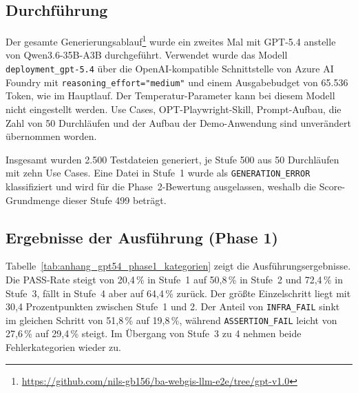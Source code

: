 \subsection{Durchführung}

Der gesamte Generierungsablauf\footnote{\url{https://github.com/nils-gb156/ba-webgis-llm-e2e/tree/gpt-v1.0}} wurde ein zweites Mal mit GPT-5.4 anstelle von Qwen3.6-35B-A3B durchgeführt. Verwendet wurde das Modell \texttt{deployment\_gpt-5.4} über die OpenAI-kompatible Schnittstelle von Azure AI Foundry mit \texttt{reasoning\_effort="medium"} und einem Ausgabebudget von 65.536 Token, wie im Hauptlauf. Der Temperatur-Parameter kann bei diesem Modell nicht eingestellt werden. Use Cases, OPT-Playwright-Skill, Prompt-Aufbau, die Zahl von 50 Durchläufen und der Aufbau der Demo-Anwendung sind unverändert übernommen worden.

Insgesamt wurden 2.500 Testdateien generiert, je Stufe 500 aus 50 Durchläufen mit zehn Use Cases. Eine Datei in Stufe~1 wurde als \texttt{GENERATION\_ERROR} klassifiziert und wird für die Phase~2-Bewertung ausgelassen, weshalb die Score-Grundmenge dieser Stufe 499 beträgt.

\subsection{Ergebnisse der Ausführung (Phase 1)}

Tabelle~\ref{tab:anhang_gpt54_phase1_kategorien} zeigt die Ausführungsergebnisse. Die PASS-Rate steigt von 20,4\,\% in Stufe~1 auf 50,8\,\% in Stufe~2 und 72,4\,\% in Stufe~3, fällt in Stufe~4 aber auf 64,4\,\% zurück. Der größte Einzelschritt liegt mit 30,4 Prozentpunkten zwischen Stufe~1 und 2. Der Anteil von \texttt{INFRA\_FAIL} sinkt im gleichen Schritt von 51,8\,\% auf 19,8\,\%, während \texttt{ASSERTION\_FAIL} leicht von 27,6\,\% auf 29,4\,\% steigt. Im Übergang von Stufe~3 zu 4 nehmen beide Fehlerkategorien wieder zu.

